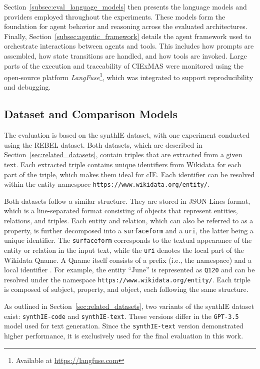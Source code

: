 \documentclass[a4paper,oneside,bibliography=totoc]{scrbook}
\begin{document}
Section~\ref{subsec:eval_language_models} then presents the language models and providers employed throughout the experiments. These models form the foundation for agent behavior and reasoning across the evaluated architectures. Finally, Section~\ref{subsec:agentic_framework} details the agent framework used to orchestrate interactions between agents and tools. This includes how prompts are assembled, how state transitions are handled, and how tools are invoked. Large parts of the execution and traceability of CIExMAS were monitored using the open-source platform \textit{LangFuse}\footnote{Available at \url{https://langfuse.com}}, which was integrated to support reproducibility and debugging.

\subsection{Dataset and Comparison Models}
\label{subsec:dataset}

The evaluation is based on the synthIE dataset, with one experiment conducted using the REBEL dataset. Both datasets, which are described in Section~\ref{sec:related_datasets}, contain triples that are extracted from a given text. Each extracted triple contains unique identifiers from Wikidata for each part of the triple, which makes them ideal for \ac{cIE}. Each identifier can be resolved within the entity namespace \texttt{https://www.wikidata.org/entity/}.

Both datasets follow a similar structure. They are stored in JSON Lines format, which is a line-separated format consisting of objects that represent entities, relations, and triples. Each entity and relation, which can also be referred to as a property, is further decomposed into a \texttt{surfaceform} and a \texttt{uri}, the latter being a unique identifier. The \texttt{surfaceform} corresponds to the textual appearance of the entity or relation in the input text, while the \texttt{uri} denotes the local part of the Wikidata Qname. A Qname itself consists of a prefix (i.e., the namespace) and a local identifier \cite{ASF2010}. For example, the entity \enquote{June} is represented as \texttt{Q120} and can be resolved under the namespace \texttt{https://www.wikidata.org/entity/}. Each triple is composed of subject, property, and object, each following the same structure.

As outlined in Section~\ref{sec:related_datasets}, two variants of the synthIE dataset exist: \texttt{synthIE-code} and \texttt{synthIE-text}. These versions differ in the \texttt{GPT-3.5} model used for text generation. Since the \texttt{synthIE-text} version demonstrated higher performance, it is exclusively used for the final evaluation in this work.
\end{document}
